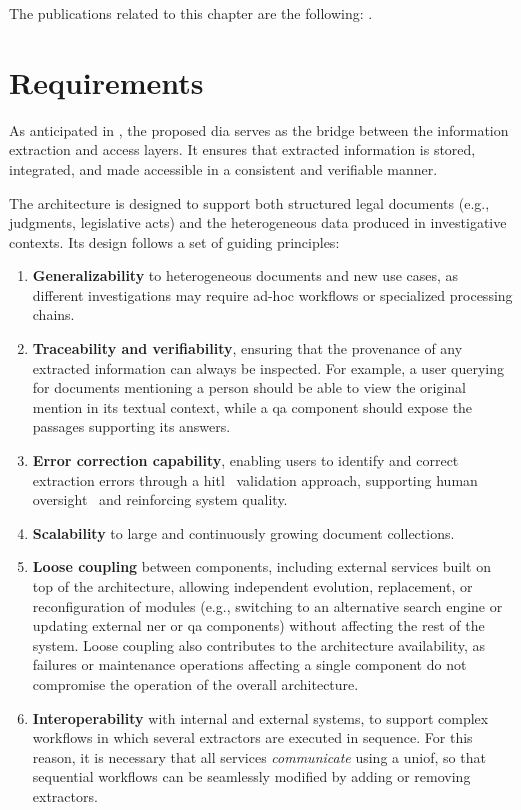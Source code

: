 The \phd publications related to this chapter are the following: \textcite{BELLANDI2024,pozzi_wise_2025,Agazzi2025DAVE}.

\section{Requirements}
\label{sec:arch:reqs}

As anticipated in , the proposed \acl{dia} serves as the bridge between the information extraction and access layers. It ensures that extracted information is stored, integrated, and made accessible in a consistent and verifiable manner.

The architecture is designed to support both structured legal documents (e.g., judgments, legislative acts) and the heterogeneous data produced in investigative contexts. Its design follows a set of guiding principles:
\begin{enumerate}
  \item \textbf{Generalizability} to heterogeneous documents and new use cases, as different investigations may require ad-hoc workflows or specialized processing chains.
  \item \textbf{Traceability and verifiability}, ensuring that the provenance of any extracted information can always be inspected. For example, a user querying for documents mentioning a person should be able to view the original mention in its textual context, while a \acl{qa} component should expose the passages supporting its answers.
  \item \textbf{Error correction capability}, enabling users to identify and correct extraction errors through a \acf{hitl}~\cite{klie-etal-2020-zero} validation approach, supporting human oversight~\cite[Art.~14]{ai_act} and reinforcing system quality.
  \item \textbf{Scalability} to large and continuously growing document collections.
  \item \textbf{Loose coupling} between components, including external services built on top of the architecture, allowing independent evolution, replacement, or reconfiguration of modules (e.g., switching to an alternative search engine or updating external \acl{ner} or \acl{qa} components) without affecting the rest of the system. Loose coupling also contributes to the architecture availability, as failures or maintenance operations affecting a single component do not compromise the operation of the overall architecture.
  \item \textbf{Interoperability} with internal and external systems, to support complex workflows in which several extractors are executed in sequence. For this reason, it is necessary that all services \emph{communicate} using a \acf{uniof}, so that sequential workflows can be seamlessly modified by adding or removing extractors.
\end{enumerate}

